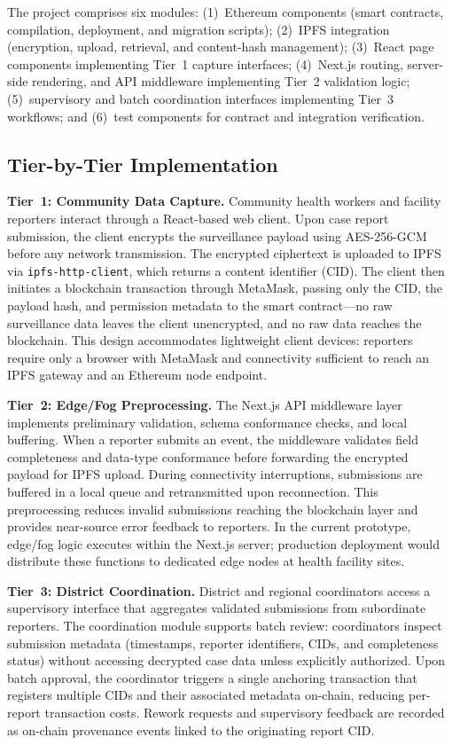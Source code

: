 \documentclass[AMA,LATO1COL]{WileyNJD-v2}
\begin{document}
The project comprises six modules: (1)~Ethereum components (smart contracts, compilation, deployment, and migration scripts); (2)~IPFS integration (encryption, upload, retrieval, and content-hash management); (3)~React page components implementing Tier~1 capture interfaces; (4)~Next.js routing, server-side rendering, and API middleware implementing Tier~2 validation logic; (5)~supervisory and batch coordination interfaces implementing Tier~3 workflows; and (6)~test components for contract and integration verification.

\subsection{Tier-by-Tier Implementation}\label{subsec:tiers}

\textbf{Tier~1: Community Data Capture.} Community health workers and facility reporters interact through a React-based web client. Upon case report submission, the client encrypts the surveillance payload using AES-256-GCM before any network transmission. The encrypted ciphertext is uploaded to IPFS via \texttt{ipfs-http-client}, which returns a content identifier (CID). The client then initiates a blockchain transaction through MetaMask, passing only the CID, the payload hash, and permission metadata to the smart contract---no raw surveillance data leaves the client unencrypted, and no raw data reaches the blockchain. This design accommodates lightweight client devices: reporters require only a browser with MetaMask and connectivity sufficient to reach an IPFS gateway and an Ethereum node endpoint.

\textbf{Tier~2: Edge/Fog Preprocessing.} The Next.js API middleware layer implements preliminary validation, schema conformance checks, and local buffering. When a reporter submits an event, the middleware validates field completeness and data-type conformance before forwarding the encrypted payload for IPFS upload. During connectivity interruptions, submissions are buffered in a local queue and retransmitted upon reconnection. This preprocessing reduces invalid submissions reaching the blockchain layer and provides near-source error feedback to reporters. In the current prototype, edge/fog logic executes within the Next.js server; production deployment would distribute these functions to dedicated edge nodes at health facility sites.

\textbf{Tier~3: District Coordination.} District and regional coordinators access a supervisory interface that aggregates validated submissions from subordinate reporters. The coordination module supports batch review: coordinators inspect submission metadata (timestamps, reporter identifiers, CIDs, and completeness status) without accessing decrypted case data unless explicitly authorized. Upon batch approval, the coordinator triggers a single anchoring transaction that registers multiple CIDs and their associated metadata on-chain, reducing per-report transaction costs. Rework requests and supervisory feedback are recorded as on-chain provenance events linked to the originating report CID.
\end{document}
